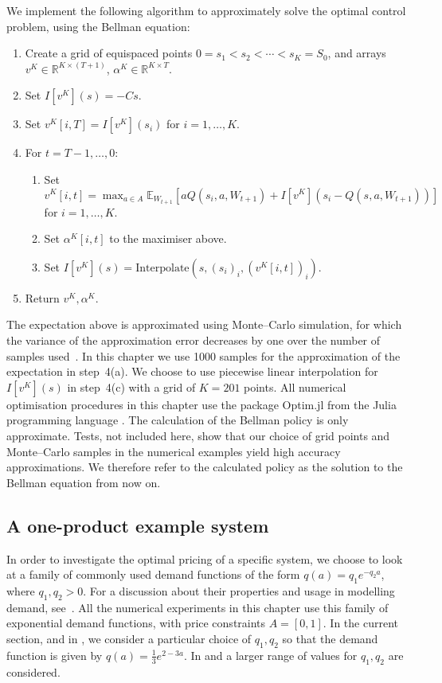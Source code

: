 \documentclass[main.tex]{subfiles}
\begin{document}
We implement the following algorithm to approximately solve the optimal control
problem, using the Bellman equation:
\begin{enumerate}
\item Create a grid of equispaced points $0=s_1<s_2<\cdots<s_K=S_0$, and arrays $v^K\in\mathbb{R}^{K\times(T+1)}$,
  $\alpha^K\in\mathbb{R}^{K\times T}$.
\item Set $I[v^K](s)=-Cs$.
\item Set $v^K[i,T]=I[v^K](s_i)$ for $i=1,\dots, K$.
\item For $t = T-1,\dots,0$:
  \begin{enumerate}
  \item Set $\displaystyle v^K[i,t]=\max_{a\in A}\mathbb{E}_{W_{t+1}}\left[ aQ(s_i,a,W_{t+1})
      +I[v^K](s_i-Q(s,a,W_{t+1}))\right]$\\ for $i=1,\dots,K$.
  \item Set $\alpha^K[i,t]$ to the maximiser above.
  \item Set $I[v^K](s) = \mathrm{Interpolate}(s, {(s_i)}_i,{(v^K[i,t])}_i)$.
  \end{enumerate}
\item Return $v^K,\alpha^K$.
\end{enumerate}
The expectation above is approximated using Monte--Carlo simulation,
for which the variance of the approximation error decreases by one over the
number of samples used~\citep{caflisch1998monte}.
In this chapter we use \num{1000} samples for the approximation of the
expectation in step~4(a).
We choose to use piecewise
linear interpolation for $I[v^K](s)$ in step~4(c) with a grid of
$K=201$ points. All numerical optimisation procedures in this chapter
use the package Optim.jl \citep{mogensen2018optim} from the Julia
programming language \citep{bezanson2017julia}.
The calculation of the Bellman policy is only
approximate. Tests, not included here, show that our choice of grid points and Monte--Carlo samples
in the numerical examples yield high accuracy approximations.
We therefore refer to the calculated policy as the solution to the
Bellman equation from now on.


\subsection{A one-product example system}\label{subsec:bellman_example_markdown}
In order to investigate the optimal pricing of a specific system, we
choose to look at a family of commonly used demand functions of the form
$q(a)=q_1e^{-q_2a}$, where $q_1,q_2>0$. For a discussion
about their properties and usage in modelling demand, see~\citet[Ch.~7]{talluri2006theory}.
All the numerical experiments in this chapter use this family of exponential
demand functions, with price constraints $A=[0,1]$.
In the current section, and in
,
we consider a particular choice of $q_1,q_2$ so that the demand
function is given by $q(a)=\frac{1}{3}e^{2-3a}$.
In  and  a larger
range of values for $q_1,q_2$ are considered.
\end{document}
